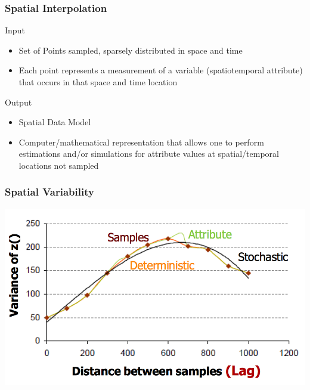 \documentclass{beamer}
\begin{document}
\begin{frame}
\frametitle{Spatial Interpolation}
\begin{block}{Input}
\begin{itemize}
\item  Set of Points sampled, sparsely distributed in space and time
\item  Each point represents a measurement of a variable (spatiotemporal attribute) that occurs in that space and time location
\end{itemize}
\end{block}
\vspace{1 cm}
\pause
\begin{block}{Output}
\begin{itemize}
\item \alert{Spatial Data Model}
\item Computer/mathematical representation that allows one to perform estimations and/or simulations for attribute values at spatial/temporal locations not sampled
\end{itemize}
\end{block}
\end{frame}


\begin{frame}
\frametitle{Spatial Variability}
\centering
\includegraphics[width=\textwidth]{Figures/vario.png}
\end{frame}

\end{document}
